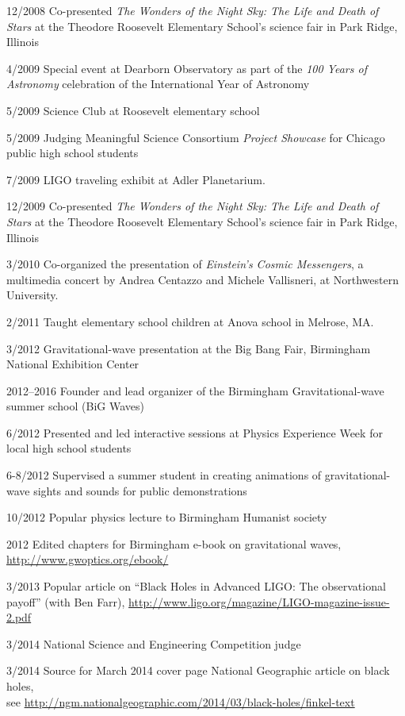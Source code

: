\documentclass[margin,line]{res}
\begin{document}
\begin{resume}
12/2008 	Co-presented {\it The Wonders of the Night Sky: The Life and Death of Stars} at the Theodore Roosevelt Elementary School's science fair in Park Ridge, Illinois

4/2009 	Special event at Dearborn Observatory as part of the {\it 100 Years of Astronomy} celebration of the International Year of Astronomy

5/2009	Science Club at Roosevelt elementary school

5/2009	Judging Meaningful Science Consortium {\it Project Showcase} for Chicago public high school students

7/2009 	 LIGO traveling exhibit at Adler Planetarium. 

12/2009 	Co-presented {\it The Wonders of the Night Sky: The Life and Death of Stars} at the Theodore Roosevelt Elementary School's science fair in Park Ridge, Illinois

3/2010  	Co-organized the presentation of {\it Einstein's Cosmic Messengers}, a multimedia concert by Andrea Centazzo and Michele Vallisneri, at Northwestern University.

2/2011	Taught elementary school children at Anova school in Melrose, MA.

3/2012	Gravitational-wave presentation at the Big Bang Fair, Birmingham National Exhibition Center

2012--2016	Founder and lead organizer of the Birmingham Gravitational-wave summer school (BiG Waves)

6/2012	Presented and led interactive sessions at Physics Experience Week for local high school students

6-8/2012	Supervised a summer student in creating animations of gravitational-wave sights and sounds for public demonstrations

10/2012	Popular physics lecture to Birmingham Humanist society

2012		Edited chapters for Birmingham e-book on gravitational waves, \url{http://www.gwoptics.org/ebook/}
	  
3/2013	Popular article on ``Black Holes in Advanced LIGO: The observational payoff'' (with Ben Farr), \url{http://www.ligo.org/magazine/LIGO-magazine-issue-2.pdf}

3/2014	National Science and Engineering Competition judge

3/2014	Source for March 2014 cover page National Geographic article on black holes,\\ see \url{http://ngm.nationalgeographic.com/2014/03/black-holes/finkel-text}


\end{resume}
\end{document}
